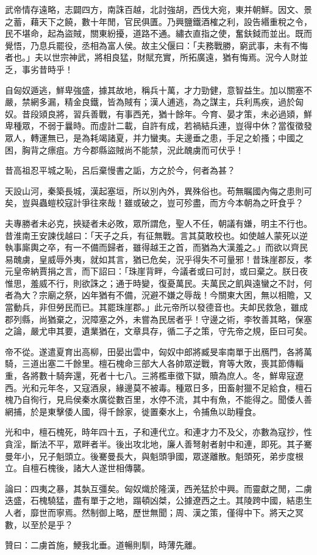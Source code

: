 \begin{pinyinscope}
武帝情存遠略，志闢四方，南誅百越，北討強胡，西伐大宛，東并朝鮮。因文、景之蓄，藉天下之饒，數十年閒，官民俱匱。乃興鹽鐵酒榷之利，設告緡重稅之令，民不堪命，起為盜賊，關東紛擾，道路不通。繡衣直指之使，奮鈇鉞而並出。既而覺悟，乃息兵罷役，丞相為富人侯。故主父偃曰：「夫務戰勝，窮武事，未有不悔者也。」夫以世宗神武，將相良猛，財賦充實，所拓廣遠，猶有悔焉。況今人財並乏，事劣昔時乎！

自匈奴遁逃，鮮卑強盛，據其故地，稱兵十萬，才力勁健，意智益生。加以關塞不嚴，禁網多漏，精金良鐵，皆為賊有；漢人逋逃，為之謀主，兵利馬疾，過於匈奴。昔段熲良將，習兵善戰，有事西羌，猶十餘年。今育、晏才策，未必過熲，鮮卑種眾，不弱于曩時。而虛計二載，自許有成，若禍結兵連，豈得中休？當復徵發眾人，轉運無已，是為耗竭諸夏，并力蠻夷。夫邊垂之患，手足之蚧搔；中國之困，胸背之瘭疽。方今郡縣盜賊尚不能禁，況此醜虜而可伏乎！

昔高祖忍平城之恥，呂后棄慢書之詬，方之於今，何者為甚？

天設山河，秦築長城，漢起塞垣，所以別內外，異殊俗也。苟無瞩國內侮之患則可矣，豈與蟲螘校寇計爭往來哉！雖或破之，豈可殄盡，而方今本朝為之旰食乎？

夫專勝者未必克，挾疑者未必敗，眾所謂危，聖人不任，朝議有嫌，明主不行也。昔淮南王安諫伐越曰：「天子之兵，有征無戰。言其莫敢校也。如使越人蒙死以逆執事廝輿之卒，有一不備而歸者，雖得越王之首，而猶為大漢羞之。」而欲以齊民易醜虜，皇威辱外夷，就如其言，猶已危矣，況乎得失不可量邪！昔珠崖郡反，孝元皇帝納賈捐之言，而下詔曰：「珠崖背畔，今議者或曰可討，或曰棄之。朕日夜惟思，羞威不行，則欲誅之；通于時變，復憂萬民。夫萬民之飢與遠蠻之不討，何者為大？宗廟之祭，凶年猶有不備，況避不嫌之辱哉！今關東大困，無以相贍，又當動兵，非但勞民而已。其罷珠崖郡。」此元帝所以發德音也。夫卹民救急，雖成郡列縣，尚猶棄之，況障塞之外，未嘗為民居者乎！守邊之術，李牧善其略，保塞之論，嚴尤申其要，遺業猶在，文章具存，循二子之策，守先帝之規，臣曰可矣。

帝不從。遂遣夏育出高柳，田晏出雲中，匈奴中郎將臧旻率南單于出鴈門，各將萬騎，三道出塞二千餘里。檀石槐命三部大人各帥眾逆戰，育等大敗，喪其節傳輜重，各將數十騎奔還，死者十七八。三將檻車徵下獄，贖為庶人。冬，鮮卑寇遼西。光和元年冬，又寇酒泉，緣邊莫不被毒。種眾日多，田畜射獵不足給食，檀石槐乃自徇行，見烏侯秦水廣從數百里，水停不流，其中有魚，不能得之。聞倭人善網捕，於是東擊倭人國，得千餘家，徙置秦水上，令捕魚以助糧食。

光和中，檀石槐死，時年四十五，子和連代立。和連才力不及父，亦數為寇抄，性貪淫，斷法不平，眾畔者半。後出攻北地，廉人善弩射者射中和連，即死。其子騫曼年小，兄子魁頭立。後騫曼長大，與魁頭爭國，眾遂離散。魁頭死，弟步度根立。自檀石槐後，諸大人遂世相傳襲。

論曰：四夷之暴，其埶互彊矣。匈奴熾於隆漢，西羌猛於中興。而靈獻之閒，二虜迭盛，石槐驍猛，盡有單于之地，蹋頓凶桀，公據遼西之土。其陵跨中國，結患生人者，靡世而寧焉。然制御上略，歷世無聞；周、漢之策，僅得中下。將天之冥數，以至於是乎？

贊曰：二虜首施，鯁我北垂。道暢則馴，時薄先離。


\end{pinyinscope}